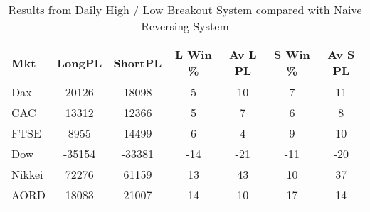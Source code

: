 \begin{table}[ht]
\centering
\caption[Daily High / Low Breakout System compared with Naive Reversing System]{Results from Daily High / Low Breakout System compared with Naive Reversing System} 
\label{ab:hl_bout_sys_diff}
\begin{tabular}{lcccccc}
  \toprule Mkt & LongPL & ShortPL & L Win \% & Av L PL & S Win \% & Av S PL \\ 
  \midrule Dax & 20126 & 18098 & 5 & 10 & 7 & 11 \\ 
  CAC & 13312 & 12366 & 5 & 7 & 6 & 8 \\ 
  FTSE & 8955 & 14499 & 6 & 4 & 9 & 10 \\ 
  Dow & -35154 & -33381 & -14 & -21 & -11 & -20 \\ 
  Nikkei & 72276 & 61159 & 13 & 43 & 10 & 37 \\ 
  AORD & 18083 & 21007 & 14 & 10 & 17 & 14 \\ 
   \bottomrule \end{tabular}
\end{table}
